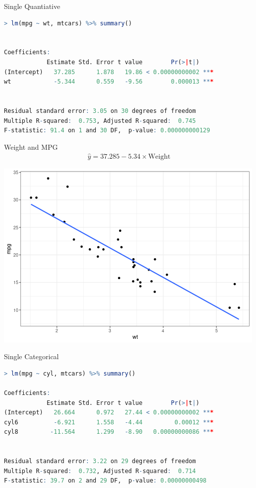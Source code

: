 \documentclass{beamer}
\begin{document}
\begin{frame}[fragile]{Single Quantiative}

\begin{lstlisting}[language=R]
> lm(mpg ~ wt, mtcars) %>% summary()


Coefficients:
            Estimate Std. Error t value        Pr(>|t|)    
(Intercept)   37.285      1.878   19.86 < 0.00000000002 ***
wt            -5.344      0.559   -9.56        0.000013 ***


Residual standard error: 3.05 on 30 degrees of freedom
Multiple R-squared:  0.753,	Adjusted R-squared:  0.745 
F-statistic: 91.4 on 1 and 30 DF,  p-value: 0.000000000129
\end{lstlisting}

\end{frame}

\begin{frame}{Weight and MPG}
\begin{align*}
\hat{y} = 37.285 - 5.34 \times \text{Weight}
\end{align*}
\begin{center}
\includegraphics[scale=0.5]{wt_mpg.png}
\end{center}
\end{frame}


\begin{frame}[fragile]{Single Categorical}

\begin{lstlisting}[language=R]
> lm(mpg ~ cyl, mtcars) %>% summary()

Coefficients:
            Estimate Std. Error t value        Pr(>|t|)    
(Intercept)   26.664      0.972   27.44 < 0.00000000002 ***
cyl6          -6.921      1.558   -4.44         0.00012 ***
cyl8         -11.564      1.299   -8.90   0.00000000086 ***


Residual standard error: 3.22 on 29 degrees of freedom
Multiple R-squared:  0.732,	Adjusted R-squared:  0.714 
F-statistic: 39.7 on 2 and 29 DF,  p-value: 0.00000000498
\end{lstlisting}

\end{frame}
\end{document}
